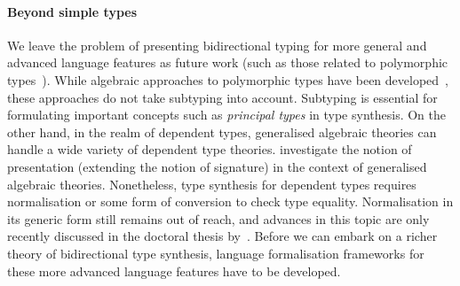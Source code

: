 
\paragraph{Beyond simple types}
We leave the problem of presenting bidirectional typing for more general and advanced language features as future work (such as those related to polymorphic types~\citep{Pierce2000,Peyton-Jones2007,Dunfield2013,Xie2018}).
While algebraic approaches to polymorphic types have been developed~\citep{Fiore2013,Hamana2011}, these approaches do not take subtyping into account.
Subtyping is essential for formulating important concepts such as \emph{principal types} in type synthesis.
On the other hand, in the realm of dependent types,  generalised algebraic theories can handle a wide variety of dependent type theories.
\citet{Bezem2021} investigate the notion of presentation (extending the notion of signature) in the context of generalised algebraic theories.
Nonetheless, type synthesis for dependent types requires normalisation or some form of conversion to check type equality.
Normalisation in its generic form still remains out of reach, and advances in this topic are only recently discussed in the doctoral thesis by~\citet{Valliappan2023}.
Before we can embark on a richer theory of bidirectional type synthesis, language formalisation frameworks for these more advanced language features have to be developed.



